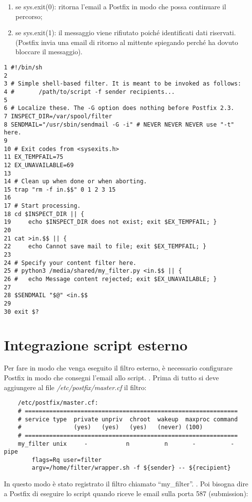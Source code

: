     
    \begin{enumerate}
        \item se sys.exit(0): ritorna l'email a Postfix in modo che possa continuare il percorso;
        \item se sys.exit(1): il messaggio viene rifiutato poiché identificati dati riservati. 
        (Postfix invia una email di ritorno al mittente spiegando perché ha dovuto bloccare il messaggio). 
    \end{enumerate}

    \begin{verbatim}
1 #!/bin/sh
2 
3 # Simple shell-based filter. It is meant to be invoked as follows:
4 #       /path/to/script -f sender recipients...
5 
6 # Localize these. The -G option does nothing before Postfix 2.3.
7 INSPECT_DIR=/var/spool/filter
8 SENDMAIL="/usr/sbin/sendmail -G -i" # NEVER NEVER NEVER use "-t" here.
9 
10 # Exit codes from <sysexits.h>
11 EX_TEMPFAIL=75
12 EX_UNAVAILABLE=69
13 
14 # Clean up when done or when aborting.
15 trap "rm -f in.$$" 0 1 2 3 15
16 
17 # Start processing.
18 cd $INSPECT_DIR || {
19     echo $INSPECT_DIR does not exist; exit $EX_TEMPFAIL; }
20 
21 cat >in.$$ || { 
22     echo Cannot save mail to file; exit $EX_TEMPFAIL; }
23 
24 # Specify your content filter here.
25 # python3 /media/shared/my_filter.py <in.$$ || {
26 #   echo Message content rejected; exit $EX_UNAVAILABLE; }
27 
28 $SENDMAIL "$@" <in.$$
29 
30 exit $?
    \end{verbatim}

    \section{Integrazione script esterno}
    Per fare in modo che venga eseguito il filtro esterno, è necessario configurare Postfix in modo
    che consegni l'email allo script.
    \newline
    . Prima di tutto si deve aggiungere al file \textit{/etc/postfix/master.cf} il filtro:

    \begin{verbatim}
    /etc/postfix/master.cf:
    # =============================================================
    # service type  private unpriv  chroot  wakeup  maxproc command
    #               (yes)   (yes)   (yes)   (never) (100)
    # =============================================================
    my_filter unix	   -	       n	      n	      - 	     -	      pipe
	    flags=Rq user=filter 
        argv=/home/filter/wrapper.sh -f ${sender} -- ${recipient}
    \end{verbatim}
    In questo modo è stato registrato il filtro chiamato ``my\_filter''.
    \newline
    . Poi bisogna dire a Postfix di eseguire lo script quando riceve le email sulla porta 587 (submission):

